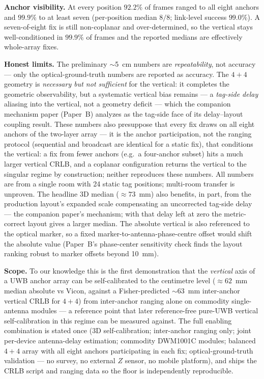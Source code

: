 \documentclass[10pt,a4paper]{article}
\begin{document}
\textbf{Anchor visibility.} At every position $92.2\%$ of frames ranged to all eight anchors and
$99.9\%$ to at least seven (per-position median $8/8$; link-level success $99.0\%$). A seven-of-eight fix is still non-coplanar and over-determined, so the vertical stays
well-conditioned in $99.9\%$ of frames and the reported medians are effectively whole-array fixes.

\textbf{Honest limits.} The preliminary $\sim$5~cm numbers are \emph{repeatability}, not accuracy ---
only the optical-ground-truth numbers are reported as accuracy. The $4{+}4$ geometry is
\emph{necessary but not sufficient} for the vertical: it completes the geometric observability, but
a systematic vertical bias remains --- a \emph{tag-side delay} aliasing into the vertical, not a
geometry deficit --- which the companion mechanism paper (Paper~B) analyzes as the tag-side face of
its delay--layout coupling result. These numbers also presuppose that every fix draws on all eight anchors of the two-layer
array --- it is the anchor participation, not the ranging protocol (sequential and broadcast are
identical for a static fix), that conditions the vertical: a fix from fewer anchors (e.g.\ a four-anchor
subset) hits a much larger vertical CRLB, and a coplanar configuration returns the vertical to the singular regime by construction; neither reproduces these numbers. All numbers are from a single room with 24 static
tag positions; multi-room transfer is unproven. The headline 3D median (${\approx}73$~mm) also benefits, in part, from the
production layout's expanded scale compensating an uncorrected tag-side delay --- the companion paper's
mechanism; with that delay left at zero the metric-correct layout gives a larger median. The absolute vertical is
also referenced to the optical marker, so a fixed marker-to-antenna-phase-centre offset would shift the
absolute value (Paper~B's phase-center sensitivity check finds the layout ranking robust to marker
offsets beyond 10~mm).

\textbf{Scope.} To our knowledge this is the first demonstration that the
\emph{vertical} axis of a UWB anchor array can be self-calibrated to the centimetre level
(${\approx}62$~mm median absolute vs Vicon, against a Fisher-predicted $\sim$63~mm inter-anchor vertical CRLB for $4{+}4$) from
inter-anchor ranging alone on commodity single-antenna modules --- a reference point that later reference-free
pure-UWB vertical self-calibration in this regime can be measured against. The full enabling combination is stated once (3D self-calibration; inter-anchor ranging only; joint per-device
antenna-delay estimation; commodity DWM1001C modules; balanced $4{+}4$ array with all eight anchors participating in each fix; optical-ground-truth
validation --- no survey, no external $Z$ sensor, no mobile platform), and ships the CRLB script and
ranging data so the floor is independently reproducible.
\end{document}
